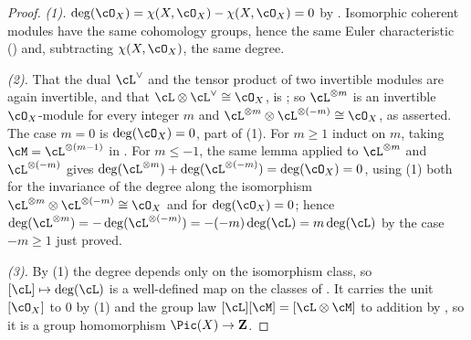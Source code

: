 \begin{proof}
\emph{(1).}  $\deg(\cO_X)=\chi(X,\cO_X)-\chi(X,\cO_X)=0$ by
.  Isomorphic coherent modules have the
same cohomology groups, hence the same Euler characteristic
() and, subtracting
$\chi(X,\cO_X)$, the same degree.

\emph{(2).}  That the dual $\cL^\vee$ and the tensor product of two
invertible modules are again invertible, and that
$\cL\otimes\cL^\vee\cong\cO_X$, is
; so $\cL^{\otimes m}$ is an
invertible $\cO_X$-module for every integer $m$ and
$\cL^{\otimes m}\otimes\cL^{\otimes(-m)}\cong\cO_X$, as asserted.  The
case $m=0$ is $\deg(\cO_X)=0$, part of (1).  For $m\ge1$ induct on $m$,
taking $\cM=\cL^{\otimes(m-1)}$ in
.  For $m\le-1$, the same lemma
applied to $\cL^{\otimes m}$ and $\cL^{\otimes(-m)}$ gives
$\deg(\cL^{\otimes m})+\deg(\cL^{\otimes(-m)})=\deg(\cO_X)=0$, using (1)
both for the invariance of the degree along the isomorphism
$\cL^{\otimes m}\otimes\cL^{\otimes(-m)}\cong\cO_X$ and for
$\deg(\cO_X)=0$; hence
$\deg(\cL^{\otimes m})=-\deg(\cL^{\otimes(-m)})=-(-m)\deg(\cL)=m\deg(\cL)$
by the case $-m\ge1$ just proved.

\emph{(3).}  By (1) the degree depends only on the isomorphism class, so
$[\cL]\mapsto\deg(\cL)$ is a well-defined map on the classes of
.  It carries the unit $[\cO_X]$ to $0$ by (1)
and the group law $[\cL][\cM]=[\cL\otimes\cM]$ to addition by
, so it is a group homomorphism
$\Pic(X)\to\mathbf Z$.
\end{proof}


